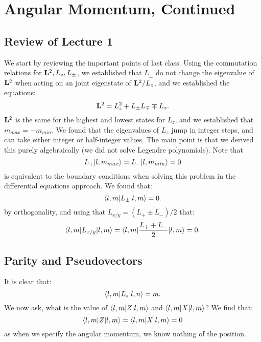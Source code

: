 \section{Angular Momentum, Continued}
\subsection{Review of Lecture 1}
We start by reviewing the important points of last class. Using the commutation relations for $\mathbf{L}^2, L_z, L_\pm$, we established that $L_\pm$ do not change the eigenvalue of $\mathbf{L}^2$ when acting on an joint eigenstate of $\mathbf{L}^2/L_z$, and we established the equations:
\begin{equation}
    \mathbf{L}^2 = L_z^2 + L_{\pm}L_{\mp} \mp L_z.
\end{equation}
$\mathbf{L}^2$ is the same for the highest and lowest states for $L_z$, and we established that $m_{max} = -m_{min}$. We found that the eigenvalues of $L_z$ jump in integer steps, and can take either integer or half-integer values. The main point is that we derived this purely algebraically (we did not solve Legendre polynomials). Note that 
\begin{equation}
    L_+\lvert l, m_{max} \rangle = L_-\lvert l, m_{min} \rangle = 0
\end{equation}
is equivalent to the boundary conditions when solving this problem in the differential equations approach. We found that:
\begin{equation}
    \langle l, m \rvert L_{\pm} \lvert l, m \rangle = 0.
\end{equation}
by orthogonality, and using that $L_{x/y} = (L_+ \pm L_-)/2$ that:
\begin{equation}
    \langle l, m \rvert L_{x/y}\lvert l, m \rangle = \langle l, m \rvert\frac{L_+ + L_-}{2}\lvert l, m \rangle = 0.
\end{equation}


\subsection{Parity and Pseudovectors}
It is clear that:
\begin{equation}
    \langle l, m \rvert L_z\lvert l, n \rangle = m.
\end{equation}
We now ask, what is the value of $\langle l, m \rvert Z\lvert l, m \rangle$ and $\langle l, m \rvert X\lvert l, m \rangle$? We find that:
\begin{equation}
    \langle l, m \rvert Z\lvert l, m \rangle = \langle l, m \rvert X\lvert l, m \rangle = 0
\end{equation}
as when we specify the angular momentum, we know nothing of the position.


